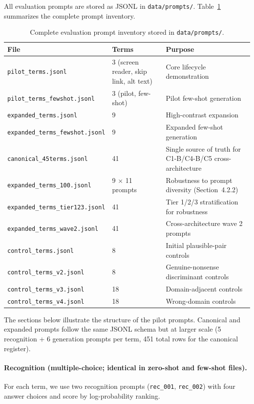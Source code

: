 \documentclass[10pt]{article} %
\begin{document}
All evaluation prompts are stored as JSONL in \texttt{data/prompts/}. Table~\ref{tab:prompt_files} summarizes the complete prompt inventory.

\begin{table}[ht]
\centering
\small
\begin{tabular}{|p{}|p{}|p{}|}
\hline
\textbf{File} & \textbf{Terms} & \textbf{Purpose} \\
\hline
\texttt{pilot\_terms.jsonl} & 3 (screen reader, skip link, alt text) & Core lifecycle demonstration \\
\texttt{pilot\_terms\_fewshot.jsonl} & 3 (pilot, few-shot) & Pilot few-shot generation \\
\texttt{expanded\_terms.jsonl} & 9 & High-contrast expansion \\
\texttt{expanded\_terms\_fewshot.jsonl} & 9 & Expanded few-shot generation \\
\texttt{canonical\_45terms.jsonl} & 41 & Single source of truth for C1-B/C4-B/C5 cross-architecture \\
\texttt{expanded\_terms\_100.jsonl} & 9 $\times$ 11 prompts & Robustness to prompt diversity (Section~4.2.2) \\
\texttt{expanded\_terms\_tier123.jsonl} & 41 & Tier 1/2/3 stratification for robustness \\
\texttt{expanded\_terms\_wave2.jsonl} & 41 & Cross-architecture wave 2 prompts \\
\texttt{control\_terms.jsonl} & 8 & Initial plausible-pair controls \\
\texttt{control\_terms\_v2.jsonl} & 8 & Genuine-nonsense discriminant controls \\
\texttt{control\_terms\_v3.jsonl} & 18 & Domain-adjacent controls \\
\texttt{control\_terms\_v4.jsonl} & 18 & Wrong-domain controls \\
\hline
\end{tabular}
\caption{Complete evaluation prompt inventory stored in \texttt{data/prompts/}.}
\label{tab:prompt_files}
\end{table}

\medskip

The sections below illustrate the structure of the pilot prompts. Canonical and expanded prompts follow the same JSONL schema but at larger scale (5 recognition + 6 generation prompts per term, 451 total rows for the canonical register).

\paragraph{Recognition (multiple-choice; identical in zero-shot and few-shot files).}
For each term, we use two recognition prompts (\texttt{rec\_001}, \texttt{rec\_002}) with four answer choices and score by log-probability ranking.
\end{document}
